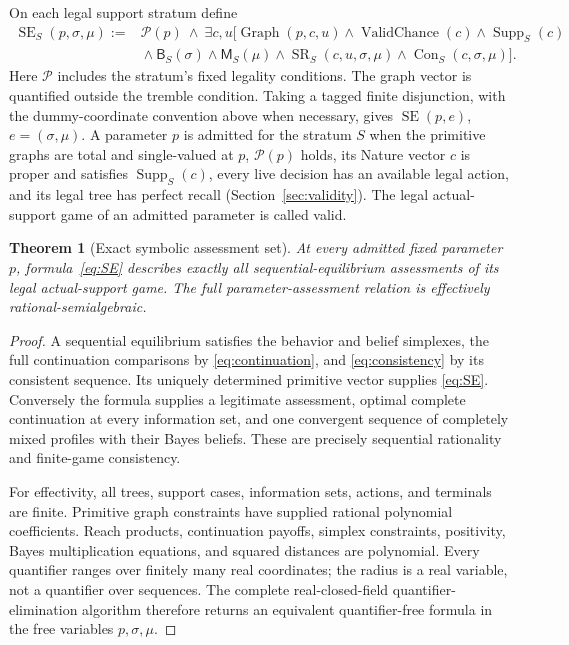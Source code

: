 \documentclass[11pt,a4paper]{article}
\numberwithin{equation}{section}
\newtheorem{theorem}{Theorem}
\theoremstyle{definition}
\DeclareMathOperator{\SE}{SE}
\DeclareMathOperator{\Graph}{Graph}
\DeclareMathOperator{\SR}{SR}
\DeclareMathOperator{\Con}{Con}
\begin{document}
On each legal support stratum define
\begin{equation}\label{eq:SE}
 \begin{split}
 \SE_S(p,\sigma,\mu):={}&\mathcal P(p)\ \wedge\
 \exists c,u\bigl[
   \Graph(p,c,u)\wedge\operatorname{ValidChance}(c)
      \wedge\operatorname{Supp}_S(c)\\
 &{}\wedge\mathsf B_S(\sigma)\wedge\mathsf M_S(\mu)
      \wedge\SR_S(c,u,\sigma,\mu)\wedge\Con_S(c,\sigma,\mu)
 \bigr].
 \end{split}
\end{equation}
Here \(\mathcal P\) includes the stratum's fixed legality conditions.
The graph vector is quantified outside the tremble condition.
Taking a tagged finite disjunction, with the dummy-coordinate convention
above when necessary, gives \(\SE(p,e)\), \(e=(\sigma,\mu)\).
A parameter \(p\) is admitted for the stratum \(S\) when the primitive
graphs are total and single-valued at \(p\), \(\mathcal P(p)\) holds, its
Nature vector \(c\) is proper and satisfies \(\operatorname{Supp}_S(c)\),
every live decision has an available legal action, and its legal tree
has perfect recall (Section~\ref{sec:validity}). The legal
actual-support game of an admitted parameter is called valid.

\begin{theorem}[Exact symbolic assessment set]\label{thm:SE}
At every admitted fixed parameter \(p\), formula~\eqref{eq:SE} describes
exactly all sequential-equilibrium assessments of its legal
actual-support game. The full parameter-assessment relation is
effectively rational-semialgebraic.
\end{theorem}
\begin{proof}
A sequential equilibrium satisfies the behavior and belief simplexes,
the full continuation comparisons by \eqref{eq:continuation}, and
\eqref{eq:consistency} by its consistent sequence.
Its uniquely determined primitive vector supplies \eqref{eq:SE}.
Conversely the formula supplies a legitimate assessment, optimal
complete continuation at every information set, and one convergent
sequence of completely mixed profiles with their Bayes beliefs.
These are precisely sequential rationality and finite-game consistency.

For effectivity, all trees, support cases, information sets, actions,
and terminals are finite. Primitive graph constraints have supplied
rational polynomial coefficients.
Reach products, continuation payoffs, simplex constraints, positivity,
Bayes multiplication equations, and squared distances are polynomial.
Every quantifier ranges over finitely many real coordinates; the radius
is a real variable, not a quantifier over sequences.
The complete real-closed-field quantifier-elimination algorithm
therefore returns an equivalent quantifier-free formula in the free
variables \(p,\sigma,\mu\).
\end{proof}
\end{document}
